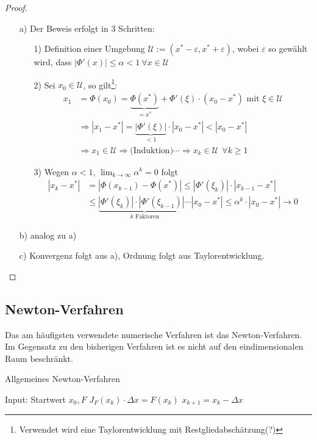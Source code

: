 \begin{proof}
~
\begin{enumerate}
\item[a)] Der Beweis erfolgt in 3 Schritten:
\begin{enumerate}
\item[1)] Definition einer Umgebung $\mathcal U:=(x^*-\varepsilon,x^*+\varepsilon)$,
  wobei $\varepsilon$ so gewählt wird, dass $|\Phi'(x)|\leq\alpha<1 ~\forall x\in \mathcal U$
\item[2)] Sei $x_0\in \mathcal U$, so gilt\footnote{Verwendet wird eine
Taylorentwicklung mit Restgliedabschätzung(?)}:
\begin{align*}
x_1&=\Phi (x_0)=\underset{=x^*}{\underbrace{\Phi(x^*)}}+\Phi'(\xi)\cdot
(x_0-x^*)\text{ mit }\xi\in \mathcal U \\
&\Rightarrow |x_1-x^*|=\underset{< 1}{\underbrace{|\Phi'(\xi)|}}\cdot |x_0-x^*|<|x_0-x^*| \\
&\Rightarrow x_1\in \mathcal U\Rightarrow \text{(Induktion)}\cdots\Rightarrow x_k\in \mathcal U \ \ \forall k\geq1
\end{align*}
\item[3)]Wegen $\alpha<1$, $\lim_{k \to\infty}{\alpha^k}=0$ folgt
\begin{align*} |x_k-x^*|&=|\Phi(x_{k-1})-\Phi(x^*)|\leq |\Phi'(\xi_k)|\cdot |x_{k-1}-x^*| \\
&\leq
  \underset{k \text{ Faktoren}}{\underbrace{|\Phi'(\xi_k)|\cdot
  |\Phi'(\xi_{k-1})|\cdots}} |x_0-x^*|\leq \alpha^k\cdot |x_0-x^*|\to 0
\end{align*}
\end{enumerate}
\item[b)] analog zu a)
\item[c)] Konvergenz folgt aus a), Ordnung folgt aus Taylorentwicklung.
\end{enumerate}
\end{proof}


\subsection{Newton-Verfahren}

Das am häufigsten verwendete numerische Verfahren ist das Newton-Verfahren. Im
Gegensatz zu den bisherigen Verfahren ist es nicht auf den eindimensionalen
Raum beschränkt.

\begin{algorithm}
\caption{Allgemeines Newton-Verfahren}
\begin{algorithmic}
\STATE Input: Startwert $x_0, F$
  \STATE $J_F(x_k)\cdot \Delta x=F(x_k)$  
  \STATE $x_{k+1}=x_k-\Delta x$           
\ENDFOR
\end{algorithmic}
\end{algorithm}

